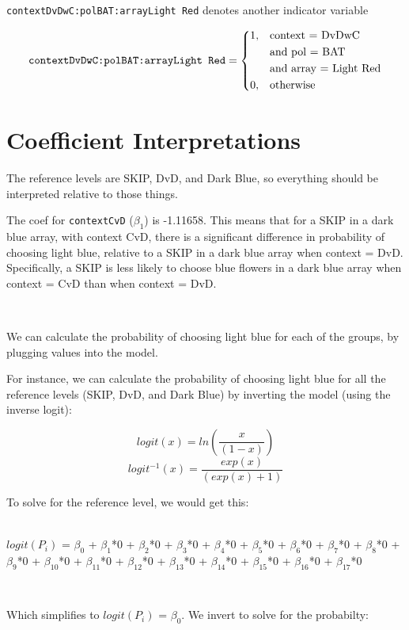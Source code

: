 \documentclass{article}
\begin{document}
\noindent
\texttt{contextDvDwC:polBAT:arrayLight Red} denotes another indicator variable 

\[
    \texttt{contextDvDwC:polBAT:arrayLight Red} = 
\begin{dcases}
	1 ,& \text{context = DvDwC } \\ 
    & \text{and pol = BAT}  \\
    & \text{and array = Light Red} \\
    0, & \text{otherwise}
\end{dcases}
\]


\section{Coefficient Interpretations}

The reference levels are SKIP, DvD, and Dark Blue, so everything should be interpreted relative to those things.


The coef for \texttt{contextCvD} ($\beta_1$) is -1.11658.  This means that for a SKIP in a dark blue array, with context CvD, there is a significant difference in probability of choosing light blue, relative to a SKIP in a dark blue array when context = DvD. Specifically, a SKIP is less likely to choose blue flowers in a dark blue array when context = CvD than when context = DvD.

\

We can calculate the probability of choosing light blue for each of the groups, by plugging values into the model.

For instance, we can calculate the probability of choosing light blue for all the reference levels (SKIP, DvD, and Dark Blue) by inverting the model (using the inverse logit):

$$logit(x) = ln\left(\frac{x}{(1-x)}\right)$$
$$logit^{-1}(x) = \frac{exp(x)}{(exp(x) + 1)}$$

To solve for the reference level, we would get this:

\noindent
\\
$logit(P_i)$ =  
$\beta_0$ + 
$\beta_1$*0 +  
$\beta_2$*0 +  
$\beta_3$*0 + 
$\beta_4$*0 + 
$\beta_5$*0 +  
$\beta_6$*0 + 
$\beta_7$*0 +  
$\beta_8$*0 + 
$\beta_9$*0 + 
$\beta_{10}$*0 +
$\beta_{11}$*0 +  
$\beta_{12}$*0 +   
$\beta_{13}$*0 + 
$\beta_{14}$*0 +
$\beta_{15}$*0 + 
$\beta_{16}$*0 +
$\beta_{17}$*0

\

Which simplifies to $logit(P_i)$ =  $\beta_0$.  We invert to solve for the probabilty: 
\end{document}
